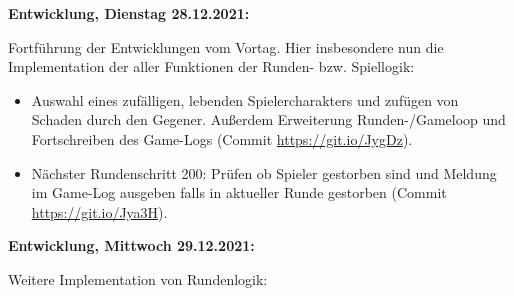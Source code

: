 \textbf{Entwicklung, Dienstag 28.12.2021:}

Fortführung der Entwicklungen vom Vortag. Hier insbesondere nun die Implementation der aller Funktionen der Runden- bzw. Spiellogik:

\begin{itemize}
    \item Auswahl eines zufälligen, lebenden Spielercharakters und zufügen von Schaden durch den Gegener. Außerdem Erweiterung Runden-/Gameloop und Fortschreiben des Game-Logs (Commit \url{https://git.io/JygDz}).
    \item Nächster Rundenschritt 200: Prüfen ob Spieler gestorben sind und Meldung im Game-Log ausgeben falls in aktueller Runde gestorben (Commit \url{https://git.io/Jya3H}). 
\end{itemize}


\textbf{Entwicklung, Mittwoch 29.12.2021:}

Weitere Implementation von Rundenlogik:

